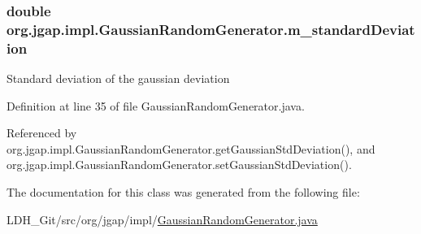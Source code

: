 \hypertarget{classorg_1_1jgap_1_1impl_1_1_gaussian_random_generator_a6682c3135c973d1dae2d061ebb90a5cc}{
\subsubsection[{m\-\_\-standard\-Deviation}]{\setlength{\rightskip}{0pt plus 5cm}double org.\-jgap.\-impl.\-Gaussian\-Random\-Generator.\-m\-\_\-standard\-Deviation\hspace{0.3cm}{\ttfamily [private]}}}\label{classorg_1_1jgap_1_1impl_1_1_gaussian_random_generator_a6682c3135c973d1dae2d061ebb90a5cc}
Standard deviation of the gaussian deviation 

Definition at line 35 of file Gaussian\-Random\-Generator.\-java.



Referenced by org.\-jgap.\-impl.\-Gaussian\-Random\-Generator.\-get\-Gaussian\-Std\-Deviation(), and org.\-jgap.\-impl.\-Gaussian\-Random\-Generator.\-set\-Gaussian\-Std\-Deviation().



The documentation for this class was generated from the following file\-:\begin{DoxyCompactItemize}
\item 
L\-D\-H\-\_\-\-Git/src/org/jgap/impl/\hyperlink{_gaussian_random_generator_8java}{Gaussian\-Random\-Generator.\-java}\end{DoxyCompactItemize}
